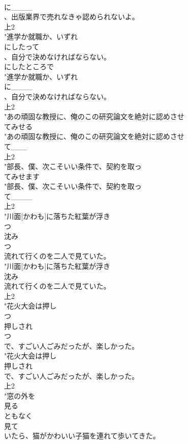 \documentclass[8pt]{extreport}
\begin{document}
\begin{CJK}{UTF8}{min}
\\	に____
\\	、出版業界で売れなきゃ認められないよ。
\\	上2
\\	"進学か就職か、いずれ
\\	にしたって
\\	、自分で決めなければならない。
\\	にしたところで
\\	"進学か就職か、いずれ
\\	に____
\\	、自分で決めなければならない。
\\	上2
\\	"あの頑固な教授に、俺のこの研究論文を絶対に認めさせ
\\	てみせる
\\	"あの頑固な教授に、俺のこの研究論文を絶対に認めさせ
\\	て___
\\	上2
\\	"部長、僕、次こそいい条件で、契約を取っ
\\	てみせます
\\	"部長、僕、次こそいい条件で、契約を取っ
\\	て____
\\	上2
\\	"川面[かわも]に落ちた紅葉が浮き
\\	つ
\\	沈み
\\	つ
\\	流れて行くのを二人で見ていた。
\\	"川面[かわも]に落ちた紅葉が浮き
\\	沈み
\\	流れて行くのを二人で見ていた。
\\	上2
\\	"花火大会は押し
\\	つ
\\	押しされ
\\	つ
\\	で、すごい人ごみだったが、楽しかった。
\\	"花火大会は押し
\\	押しされ
\\	で、すごい人ごみだったが、楽しかった。
\\	上2
\\	"窓の外を
\\	見る
\\	ともなく
\\	見て
\\	いたら、猫がかわいい子猫を連れて歩いてきた。

\end{CJK}
\end{document}
